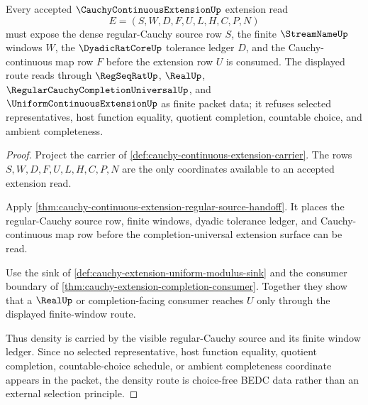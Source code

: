 \begin{theorem}
\label{thm:cauchy-continuous-extension-choice-free-density-route}
Every accepted $\CauchyContinuousExtensionUp$ extension read
$$
E=(S,W,D,F,U,L,H,C,P,N)
$$
must expose the dense regular-Cauchy source row $S$, the finite $\StreamNameUp$ windows $W$, the $\DyadicRatCoreUp$ tolerance ledger $D$, and the Cauchy-continuous map row $F$ before the extension row $U$ is consumed. The displayed route reads through $\RegSeqRatUp$, $\RealUp$, $\RegularCauchyCompletionUniversalUp$, and $\UniformContinuousExtensionUp$ as finite packet data; it refuses selected representatives, host function equality, quotient completion, countable choice, and ambient completeness.
\end{theorem}
\begin{proof}
Project the carrier of \autoref{def:cauchy-continuous-extension-carrier}. The rows $S,W,D,F,U,L,H,C,P,N$ are the only coordinates available to an accepted extension read.

Apply \autoref{thm:cauchy-continuous-extension-regular-source-handoff}. It places the regular-Cauchy source row, finite windows, dyadic tolerance ledger, and Cauchy-continuous map row before the completion-universal extension surface can be read.

Use the sink of \autoref{def:cauchy-extension-uniform-modulus-sink} and the consumer boundary of \autoref{thm:cauchy-extension-completion-consumer}. Together they show that a $\RealUp$ or completion-facing consumer reaches $U$ only through the displayed finite-window route.

Thus density is carried by the visible regular-Cauchy source and its finite window ledger. Since no selected representative, host function equality, quotient completion, countable-choice schedule, or ambient completeness coordinate appears in the packet, the density route is choice-free BEDC data rather than an external selection principle.
\end{proof}

